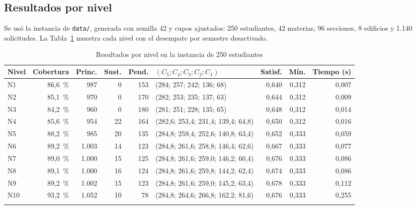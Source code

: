 
\subsection{Resultados por nivel}

Se usó la instancia de \texttt{data/}, generada con semilla 42 y cupos ajustados: 250 estudiantes, 42 materias, 96 secciones, 8 edificios y 1.140 solicitudes. La Tabla~\ref{tab:resultados-niveles} muestra cada nivel con el desempate por semestre desactivado.

\begin{table}[htbp]
\caption{Resultados por nivel en la instancia de 250 estudiantes}\label{tab:resultados-niveles}
\footnotesize
\begin{tabular*}{\textwidth}{@{\extracolsep\fill}lrrrrlrrr@{}}
\toprule
Nivel & Cobertura & Princ. & Sust. & Pend. & $(C_5;C_4;C_3;C_2;C_1)$ & Satisf. & Mín. & Tiempo (s) \\
\midrule
N1 & 86,6~\% & 987 & 0 & 153 & (284; 257; 242; 136; 68) & 0,640 & 0,312 & 0,007 \\
N2 & 85,1~\% & 970 & 0 & 170 & (282; 253; 235; 137; 63) & 0,644 & 0,312 & 0,009 \\
N3 & 84,2~\% & 960 & 0 & 180 & (281; 251; 228; 135; 65) & 0,648 & 0,312 & 0,014 \\
N4 & 85,6~\% & 954 & 22 & 164 & (282,6; 253,4; 231,4; 139,4; 64,8) & 0,650 & 0,312 & 0,016 \\
N5 & 88,2~\% & 985 & 20 & 135 & (284,8; 259,4; 252,6; 140,8; 63,4) & 0,652 & 0,333 & 0,059 \\
N6 & 89,2~\% & 1.003 & 14 & 123 & (284,8; 261,6; 258,8; 146,4; 62,6) & 0,667 & 0,333 & 0,077 \\
N7 & 89,0~\% & 1.000 & 15 & 125 & (284,8; 261,6; 259,0; 146,2; 60,4) & 0,676 & 0,333 & 0,086 \\
N8 & 89,1~\% & 1.000 & 16 & 124 & (284,8; 261,6; 259,8; 144,2; 62,4) & 0,674 & 0,333 & 0,086 \\
N9 & 89,2~\% & 1.002 & 15 & 123 & (284,8; 261,6; 259,0; 145,2; 63,4) & 0,678 & 0,333 & 0,112 \\
N10 & 93,2~\% & 1.052 & 10 & 78 & (284,8; 264,6; 266,8; 162,2; 81,6) & 0,676 & 0,333 & 0,255 \\
\botrule
\end{tabular*}
\end{table}

